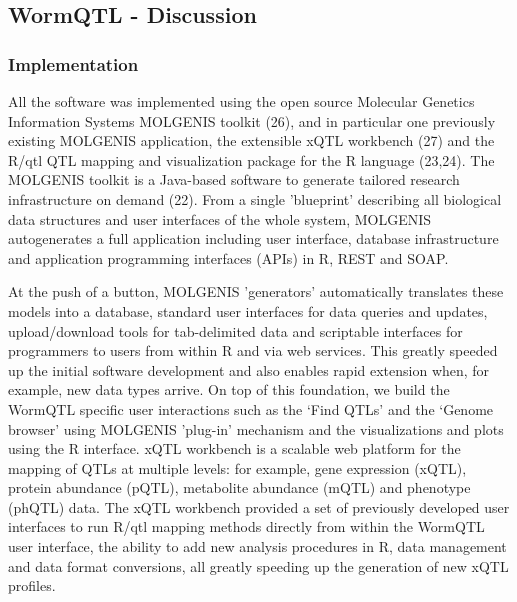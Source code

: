 \documentclass[8pt, twoside, a5paper]{report}
\begin{document}
\subsection{WormQTL - Discussion}
\subsubsection{Implementation}
All the software was implemented using the open source Molecular Genetics Information Systems MOLGENIS toolkit (26), and in 
particular one previously existing MOLGENIS application, the extensible xQTL workbench (27) and the R/qtl QTL mapping and 
visualization package for the R language (23,24). The MOLGENIS toolkit is a Java-based software to generate tailored research 
infrastructure on demand (22). From a single 'blueprint' describing all biological data structures and user interfaces of the 
whole system, MOLGENIS autogenerates a full application including user interface, database infrastructure and application 
programming interfaces (APIs) in R, REST and SOAP.

At the push of a button, MOLGENIS 'generators' automatically translates these models into a database, standard user interfaces 
for data queries and updates, upload/download tools for tab-delimited data and scriptable interfaces for programmers to users 
from within R and via web services. This greatly speeded up the initial software development and also enables rapid extension 
when, for example, new data types arrive. On top of this foundation, we build the WormQTL specific user interactions such as 
the ‘Find QTLs’ and the ‘Genome browser’ using MOLGENIS 'plug-in' mechanism and the visualizations and plots using the R 
interface. xQTL workbench is a scalable web platform for the mapping of QTLs at multiple levels: for example, gene expression 
(xQTL), protein abundance (pQTL), metabolite abundance (mQTL) and phenotype (phQTL) data. The xQTL workbench provided a set of 
previously developed user interfaces to run R/qtl mapping methods directly from within the WormQTL user interface, the ability 
to add new analysis procedures in R, data management and data format conversions, all greatly speeding up the generation of 
new xQTL profiles.
\end{document}
